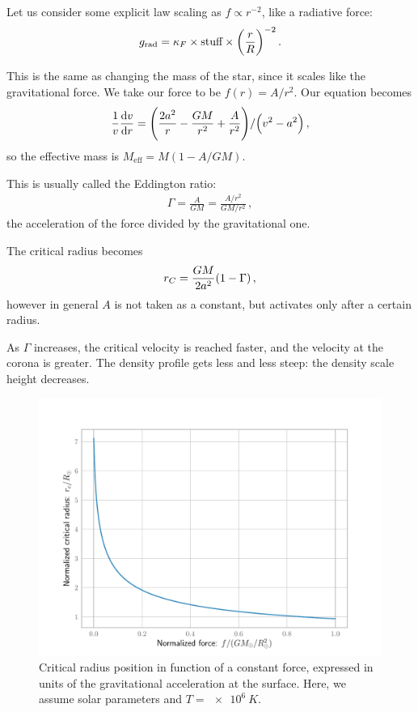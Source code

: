 \documentclass[main.tex]{subfiles}
\begin{document}
Let us consider some explicit law scaling as \(f \propto r^{-2}\), like a radiative force: 
%
\begin{align}
  g _{\text{rad}} = \kappa_F \times \text{stuff} \times \qty(\frac{r}{R})^{-2}
\,.
\end{align}

This is the same as changing the mass of the star, since it scales like the gravitational force. We take our force to be \(f(r) = A / r^2\). Our equation becomes 
%
\begin{align}
  \frac{1}{v} \dv{v}{r}  = \qty(\frac{2 a^2}{r} - \frac{GM}{r^2} + \frac{A}{r^2}) / \qty(v^2- a^2)
\,,
\end{align}
%
so the effective mass is \(M _{\text{eff}} = M ( 1- A / GM)\).

This is usually called the Eddington ratio: 
%
\begin{align}
  \Gamma = \frac{A}{GM} = \frac{A/r^2}{GM / r^2}
\,,
\end{align}
%
the acceleration of the force divided by the gravitational one.


The critical radius becomes 
%
\begin{align}
  r_C = \frac{GM}{2a^2} \qty(1 - \Gamma )
\,,
\end{align}
%
however in general \(A\) is not taken as a constant, but activates only after a certain radius.

As \(\Gamma \) increases, the critical velocity is reached faster, and the velocity at the corona is greater.
The density profile gets less and less steep: the density scale height decreases.

\begin{figure}[H]
\centering
\includegraphics[width=\textwidth]{figures/critical_radius_position.pdf}
\caption{Critical radius position in function of a constant force, expressed in units of the gravitational acceleration at the surface. Here, we assume solar parameters and \(T = \SI{e6}{K}\).}
\label{fig:critical_radius_position}
\end{figure}
\end{document}
